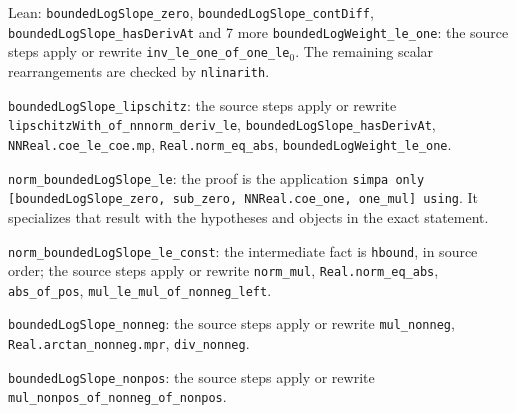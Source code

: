 \documentclass[11pt,a4paper]{report}
\begin{document}
\begin{leanbox}{Lean: \texttt{boundedLogSlope\_\allowbreak{}zero}, \texttt{boundedLogSlope\_\allowbreak{}contDiff}, \texttt{boundedLogSlope\_\allowbreak{}hasDerivAt} and 7 more}
\texttt{bounded\allowbreak{}Log\allowbreak{}Weight\_\allowbreak{}le\_\allowbreak{}one}: the source steps apply or rewrite \texttt{inv\_\allowbreak{}le\_\allowbreak{}one\_\allowbreak{}of\_\allowbreak{}one\_\allowbreak{}le\ensuremath{{}_{0}}}. The remaining scalar rearrangements are checked by \texttt{nlinarith}.



\texttt{bounded\allowbreak{}Log\allowbreak{}Slope\_\allowbreak{}lipschitz}: the source steps apply or rewrite \texttt{lipschitz\allowbreak{}With\_\allowbreak{}of\_\allowbreak{}nnnorm\_\allowbreak{}deriv\_\allowbreak{}le}, \texttt{bounded\allowbreak{}Log\allowbreak{}Slope\_\allowbreak{}has\allowbreak{}Deriv\allowbreak{}At}, \texttt{NNReal.\allowbreak{}coe\_\allowbreak{}le\_\allowbreak{}coe.\allowbreak{}mp}, \texttt{Real.\allowbreak{}norm\_\allowbreak{}eq\_\allowbreak{}abs}, \texttt{bounded\allowbreak{}Log\allowbreak{}Weight\_\allowbreak{}le\_\allowbreak{}one}.



\texttt{norm\_\allowbreak{}bounded\allowbreak{}Log\allowbreak{}Slope\_\allowbreak{}le}: the proof is the application \texttt{simpa only [bounded\allowbreak{}Log\allowbreak{}Slope\_\allowbreak{}zero, sub\_\allowbreak{}zero, NNReal.\allowbreak{}coe\_\allowbreak{}one, one\_\allowbreak{}mul] using}. It specializes that result with the hypotheses and objects in the exact statement.



\texttt{norm\_\allowbreak{}bounded\allowbreak{}Log\allowbreak{}Slope\_\allowbreak{}le\_\allowbreak{}const}: the intermediate fact is \texttt{hbound}, in source order; the source steps apply or rewrite \texttt{norm\_\allowbreak{}mul}, \texttt{Real.\allowbreak{}norm\_\allowbreak{}eq\_\allowbreak{}abs}, \texttt{abs\_\allowbreak{}of\_\allowbreak{}pos}, \texttt{mul\_\allowbreak{}le\_\allowbreak{}mul\_\allowbreak{}of\_\allowbreak{}nonneg\_\allowbreak{}left}.



\texttt{bounded\allowbreak{}Log\allowbreak{}Slope\_\allowbreak{}nonneg}: the source steps apply or rewrite \texttt{mul\_\allowbreak{}nonneg}, \texttt{Real.\allowbreak{}arctan\_\allowbreak{}nonneg.\allowbreak{}mpr}, \texttt{div\_\allowbreak{}nonneg}.



\texttt{bounded\allowbreak{}Log\allowbreak{}Slope\_\allowbreak{}nonpos}: the source steps apply or rewrite \texttt{mul\_\allowbreak{}nonpos\_\allowbreak{}of\_\allowbreak{}nonneg\_\allowbreak{}of\_\allowbreak{}nonpos}.
\end{leanbox}
\end{document}
